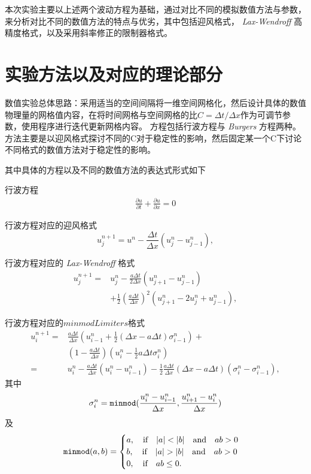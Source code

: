 \documentclass[10.5pt
]{article}
\begin{document}
本次实验主要以上述两个波动方程为基础，通过对比不同的模拟数值方法与参数，来分析对比不同的数值方法的特点与优劣，其中包括迎风格式， \textit{Lax-Wendroff} 高精度格式，以及采用斜率修正的限制器格式。

\section{实验方法以及对应的理论部分}
数值实验总体思路：采用适当的空间间隔将一维空间网格化，然后设计具体的数值物理量的网格值内容，在将时间网格与空间网格的比$C = \Delta t / \Delta x$作为可调节参数，使用程序进行迭代更新网格内容。
方程包括行波方程与 \textit{Burgers} 方程两种。方法主要是以迎风格式探讨不同的C对于稳定性的影响，然后固定某一个C下讨论不同格式的数值方法对于稳定性的影响。

其中具体的方程以及不同的数值方法的表达式形式如下

行波方程
\begin{align}
\frac{\partial u}{\partial t} + \frac{\partial u}{\partial x} = 0
\end{align}

行波方程对应的迎风格式\cite{he_volume-preserving_2015}
\begin{equation}
u_j^{n+1} = u^n - \frac{\Delta t}{\Delta x} (u_j^n - u_{j-1}^n), \label{EqnUpwind}
\end{equation}

行波方程对应的 \textit{Lax-Wendroff} 格式
\begin{align}
	u_j^{n+1} 
	=&
	u_j^{n} 
	-
	\frac{a \Delta t}{ 2 \Delta x } (  	u_{j+1}^{n} - u_{j-1}^{n} ) \\
	&+ \frac{1}{2} \left( \frac{a \Delta t}{ \Delta x } \right)^2 (  	u_{j+1}^{n}- 2 u_j^n + u_{j-1}^{n} ),
\end{align}

 
行波方程对应的$minmod Limiters$格式
\begin{equation}
\begin{aligned}
u_i^{n+1}= & \frac{a \Delta t}{\Delta x}\left(u_{i-1}^n+\frac{1}{2}(\Delta x-a \Delta t) \sigma_{i-1}^n\right)+ \\
& \left(1-\frac{a \Delta t}{\Delta x}\right)\left(u_i^n-\frac{1}{2} a \Delta t \sigma_i^n\right) \\
= & u_i^n-\frac{a \Delta t}{\Delta x}\left(u_i^n-u_{i-1}^n\right)-\frac{1}{2} \frac{a \Delta t}{\Delta x}(\Delta x-a \Delta t)\left(\sigma_i^n-\sigma_{i-1}^n\right),
\end{aligned}
\end{equation}
其中
\begin{equation}
	\sigma_i^n = \verb|minmod| ( \frac{u_i^n - u_{i-1}^{n}}{ \Delta x }, \frac{u_{i+1}^n - u_{i}^{n}}{ \Delta x } )
\end{equation}
及
\begin{equation}
	\verb|minmod|(a, b) = 
	\begin{cases}
		a, \qif |a| < |b| \qand ab > 0\\
		b, \qif |a| > |b| \qand ab > 0\\
		0, \qif ab \leq 0.
	\end{cases}
\end{equation}
\end{document}
